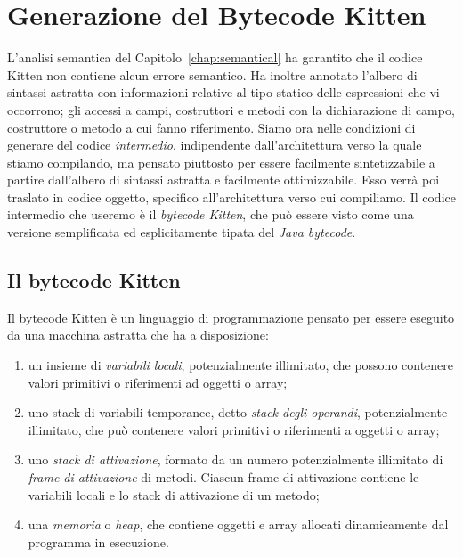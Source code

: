 \chapter{Generazione del Bytecode Kitten}\label{chap:translate}
%
\vspace*{-2ex}
\begin{center}
\end{center}
%
L'analisi semantica del Capitolo~\ref{chap:semantical} ha garantito che
il codice Kitten non contiene alcun errore semantico. Ha inoltre
annotato l'albero di sintassi astratta con informazioni relative
al tipo statico delle espressioni che vi occorrono; gli accessi a
campi, costruttori e metodi con la dichiarazione di campo, costruttore
o metodo a cui fanno riferimento. Siamo ora nelle condizioni di
generare del codice \emph{intermedio}, \cioe indipendente dall'architettura
verso la quale stiamo compilando, ma pensato piuttosto per essere
facilmente sintetizzabile a partire dall'albero di sintassi astratta
e facilmente ottimizzabile. Esso verr\`a poi traslato in codice oggetto,
specifico all'architettura verso cui compiliamo.
Il codice intermedio che useremo \`e il \emph{bytecode Kitten}, che pu\`o
essere visto come una versione semplificata ed esplicitamente tipata del
\emph{Java bytecode}.
%
\section{Il bytecode Kitten}
%
Il bytecode Kitten \`e un linguaggio di programmazione pensato per
essere eseguito da una macchina astratta che ha a disposizione:
%
\begin{enumerate}
\item un insieme di \emph{variabili locali}, potenzialmente illimitato, che
      possono contenere valori primitivi o riferimenti ad oggetti o array;
\item uno stack di variabili temporanee, detto \emph{stack degli operandi},
      potenzialmente illimitato, che pu\`o contenere valori primitivi o
      riferimenti a oggetti o array;
\item uno \emph{stack di attivazione}, formato da un numero potenzialmente
      illimitato di \emph{frame di attivazione} di metodi. Ciascun frame
      di attivazione contiene le variabili locali e lo stack di attivazione
      di un metodo;
\item una \emph{memoria} o \emph{heap}, che contiene oggetti e array
      allocati dinamicamente dal programma in esecuzione.
\end{enumerate}

